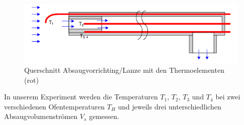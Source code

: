 \begin{figure}[H]
\centering
\includegraphics[width=\textwidth]{pics/lanze.png}
\caption{Querschnitt Absaugvorrichting/Lanze mit den Thermoelementen (rot)}
\label{pic:lanze}
\end{figure}

In unserem Experiment werden die Temperaturen $T_1$, $T_2$, $T_3$ und $T_4$ bei zwei verschiedenen Ofentemperaturen $T_H$ und jeweils drei unterschiedlichen Absaugvolumenströmen $V_s$ gemessen.

